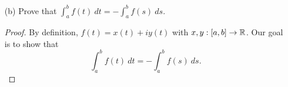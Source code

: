 \documentclass[a4paper]{article}
\begin{document}
\begin{enumerate}
\begin{enumerate}
\begin{proof}
\begin{align*}
                \end{align*}
                Note that 
                \[ \int_{ a }^{ b } \int_{ a }^{ b }  [y(t) x(s) - x(t) y(s)] \ dt \ ds =  \int_{ a }^{ b }  \int_{ a }^{ b }  y(t) x(s)  \ dt ds - \int_{ a }^{ b }  \int_{ a }^{ b }  x(t) y(s) \ dt \ ds = 0. \]
                Hence, we see that
                \[ \Big| \int_{ a }^{ b } f(t) \ dt  \Big|^{2} = \int_{ a }^{ b } \int_{ a }^{ b } [x(t) x(s) + y(s) x(t)] \ dt ds. \tag{*} \]
                Now, notice we have
                \begin{align*}
                | x(t)x(s) + y(s) x(t) | &\leq \sqrt{ ((x(t))^{2} + (y(t))^{2}) ((x(s))^{2} + (y(s))^{2}) } \\      
                                             &= \sqrt{ ((x(t))^{2} + (y(t))^{2}) } \cdot \sqrt{ ((x(s))^{2} + (y(s))^{2}) } 
            \end{align*}
            by the Cauchy-Schwarz inequality. So, (*) implies that 
            \begin{align*}
                \Big| \int_{ a }^{ b } f(t) \ dt \Big|^{2} &= \int_{ a }^{ b }  \int_{ a }^{ b }  [x(t) x(s) + y(s) x(t)] \ dt ds \\
            &\leq \int_{ a }^{ b }  \int_{ a }^{ b } \sqrt{ ((x(t))^{2} + (y(t))^{2}) }  \cdot \sqrt{ ((x(s))^{2} + (y(s))^{2}) }   \ dt  ds  \\ 
                                                       &= \Big( \int_{ a }^{ b }  \sqrt{ ((x(t))^{2} + (y(t))^{2}) }  \ dt \Big) \cdot \Big(  \int_{ a }^{ b }  \sqrt{ (x(s))^{2} + (y(s))^{2} }  \ ds  \Big) \\
                                                       &= \Big(  \int_{ a }^{ b }  \sqrt{ (x(t))^{2} + (y(t))^{2} }  \ dt \Big)^{2} \\
                                                       &= \Big( \int_{ a }^{ b } | f(t) |  \ dt \Big)^{2}.
        \end{align*}
        Hence, squaring both sides will gives us our desired result; that is,
        \[  \Big| \int_{ a }^{ b } f(t) \ dt \Big|^{2} \leq \int_{ a }^{ b } | f(t) |  \ dt. \]
                \end{proof}
            \item[(b)] Prove that \( \int_{ a }^{ b } f(t) \ dt = - \int_{ a }^{ b }  f(s) \ ds \). 
                \begin{proof}
                    By definition, \( f(t) = x(t) + i y(t) \) with \( x,y : [a,b] \to \mathbb{R}  \). Our goal is to show that 
                \[  \int_{ a }^{ b } f(t) \ dt = - \int_{ a }^{ b }  f(s) \ ds.  \tag{*} \]

\end{proof}
\end{enumerate}
\end{enumerate}
\end{document}

